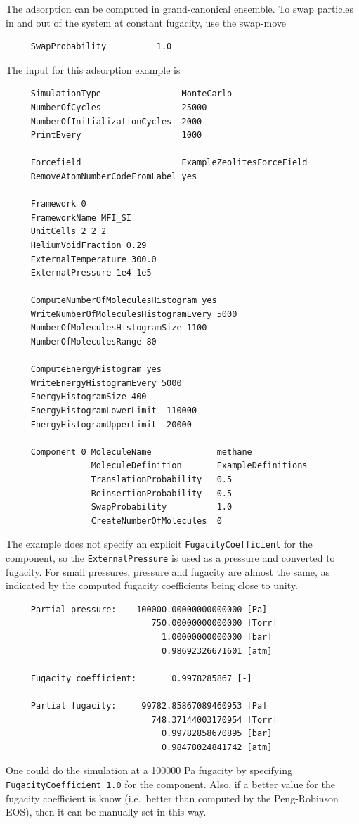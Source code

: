The adsorption can be computed in grand-canonical ensemble. To swap particles in and out of the system
at constant fugacity, use the swap-move
\begin{verbatim}
     SwapProbability          1.0
\end{verbatim}
The input for this adsorption example is
\begin{tiny}
\begin{verbatim}
     SimulationType                MonteCarlo
     NumberOfCycles                25000
     NumberOfInitializationCycles  2000
     PrintEvery                    1000
     
     Forcefield                    ExampleZeolitesForceField
     RemoveAtomNumberCodeFromLabel yes
     
     Framework 0
     FrameworkName MFI_SI
     UnitCells 2 2 2
     HeliumVoidFraction 0.29
     ExternalTemperature 300.0
     ExternalPressure 1e4 1e5
     
     ComputeNumberOfMoleculesHistogram yes
     WriteNumberOfMoleculesHistogramEvery 5000
     NumberOfMoleculesHistogramSize 1100
     NumberOfMoleculesRange 80
     
     ComputeEnergyHistogram yes
     WriteEnergyHistogramEvery 5000
     EnergyHistogramSize 400
     EnergyHistogramLowerLimit -110000
     EnergyHistogramUpperLimit -20000
     
     Component 0 MoleculeName             methane
                 MoleculeDefinition       ExampleDefinitions
                 TranslationProbability   0.5
                 ReinsertionProbability   0.5
                 SwapProbability          1.0
                 CreateNumberOfMolecules  0
\end{verbatim}
\end{tiny}

The example does not specify an explicit \verb+FugacityCoefficient+ for the component, so the \verb+ExternalPressure+ 
is used as a pressure and converted to fugacity. For small pressures, pressure and fugacity are almost the same, as
indicated by the computed fugacity coefficients being close to unity.
\begin{tiny}
\begin{verbatim}
     Partial pressure:    100000.00000000000000 [Pa]
                             750.00000000000000 [Torr]
                               1.00000000000000 [bar]
                               0.98692326671601 [atm]
     
     Fugacity coefficient:       0.9978285867 [-]
     
     Partial fugacity:     99782.85867089460953 [Pa]
                             748.37144003170954 [Torr]
                               0.99782858670895 [bar]
                               0.98478024841742 [atm]
\end{verbatim}
\end{tiny}
One could do the simulation at a 100000 Pa fugacity by specifying \verb+FugacityCoefficient 1.0+ for the component.
Also, if a better value for the fugacity coefficient is know (i.e.\ better than computed by the Peng-Robinson EOS),
then it can be manually set in this way.

